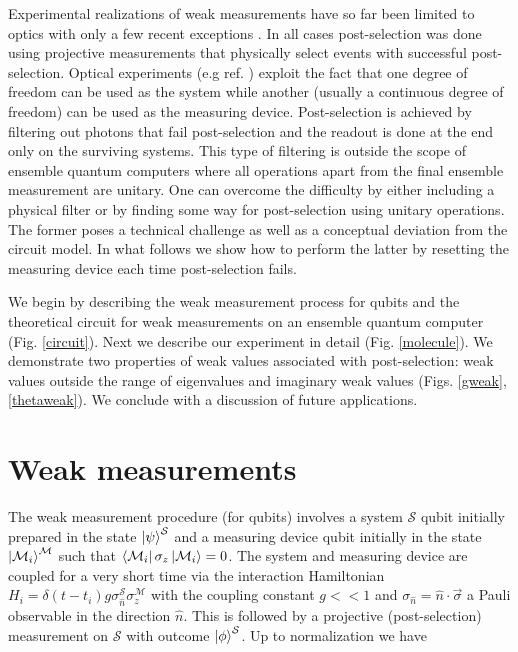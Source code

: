 \documentclass[aps,pra,12pt,onecolumn,showpacs,superscriptaddress,floatfix,footinbib,subfigure]{revtex4}
\def\bra#1{\mathinner{\langle{#1}|}}
\def\ket#1{\mathinner{|{#1}\rangle}}
\def\es{{\mathcal{S}}}
\def\md{{\mathcal{M}}}
\def\sn{ \sigma_{ \hat{n} } }
\begin{document}
Experimental realizations of weak measurements  have so far been limited to optics with only a few recent exceptions  \cite{Shomroni2013, Groen2013}. In all cases post-selection was done using projective measurements that physically select events with successful  post-selection.  Optical experiments (e.g ref. \cite{Ritchie1991}) exploit the fact that one degree of freedom can be used as the system while another (usually a continuous degree of freedom) can be used as the measuring device.  Post-selection is  achieved  by filtering out photons that fail post-selection and the readout is done at the end only on the surviving systems. This type of filtering is outside the scope of ensemble quantum computers where all operations apart from the final ensemble measurement are unitary. One can overcome the difficulty by either  including a physical filter or by finding some way for post-selection using unitary operations. The former poses a technical challenge  as well as a conceptual deviation from the circuit model. In what follows we show how to perform the latter by resetting the measuring device each time post-selection fails.

 We begin by describing the weak measurement process for qubits and the theoretical circuit  for weak measurements on an ensemble quantum computer (Fig. \ref{circuit}). Next we describe our experiment in detail (Fig. \ref{molecule}). We demonstrate two properties of weak values associated with post-selection: weak values outside the range of eigenvalues and imaginary weak values (Figs. \ref{gweak}, \ref{thetaweak}). We conclude with a discussion of future applications.


\section{Weak measurements}
The weak measurement  procedure (for qubits)  \cite{Brun2008}  involves a system $\es$ qubit  initially prepared in the state $\ket{\psi}^\es$ and a measuring device qubit  initially in the state $\ket{\md_i}^\md$ such that $\bra{\md_i}\sigma_z\ket{\md_i}=0$. The system and measuring device are coupled for a very short time  via the interaction  Hamiltonian  $H_i=\delta(t-t_i)g\sn^\es\sigma_z^\md$ with the coupling constant  $g<<1$  and $\sn=\hat{n}\cdot\vec{\sigma}$ a Pauli observable in the direction $\hat{n}$.  This is followed by a projective (post-selection) measurement on $\es$ with outcome $\ket{\phi}^\es$. Up to normalization we have
\end{document}
